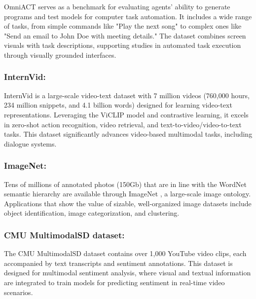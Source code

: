 \documentclass[runningheads]{llncs}
\begin{document}
OmniACT \cite{ref93} serves as a benchmark for evaluating agents' ability to generate programs and test models for computer task automation. It includes a wide range of tasks, from simple commands like "Play the next song" to complex ones like "Send an email to John Doe with meeting details." The dataset combines screen visuals with task descriptions, supporting studies in automated task execution through visually grounded interfaces.


	
\subsubsection{InternVid:}

InternVid \cite{ref90} is a large-scale video-text dataset with 7 million videos (760,000 hours, 234 million snippets, and 4.1 billion words) designed for learning video-text representations. Leveraging the ViCLIP model and contrastive learning, it excels in zero-shot action recognition, video retrieval, and text-to-video/video-to-text tasks. This dataset significantly advances video-based multimodal tasks, including dialogue systems.



\subsubsection{ImageNet:}
Tens of millions of annotated photos (150Gb) that are in line with the WordNet semantic hierarchy are available through ImageNet \cite{ref95}, a large-scale image ontology. Applications that show the value of sizable, well-organized image datasets include object identification, image categorization, and clustering.



\subsubsection{CMU MultimodalSD dataset:}

The CMU MultimodalSD dataset \cite{ref71} contains over 1,000 YouTube video clips, each accompanied by text transcripts and sentiment annotations. This dataset is designed for multimodal sentiment analysis, where visual and textual information are integrated to train models for predicting sentiment in real-time video scenarios.
\end{document}
